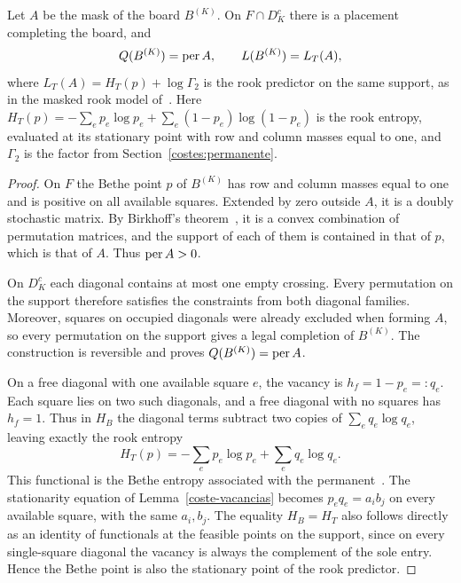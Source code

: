 \begin{lema}\label{terminal-pivotes}
Let $A$ be the mask of the board $B^{(K)}$. On $F\cap D_K^c$ there is a placement completing the
board, and
\[
 Q(B^{(K)})=\operatorname{per} A,\qquad L(B^{(K)})=L_T(A),
\]
where $L_T(A)=H_T(p)+\log\Gamma_2$ is the rook predictor on the same support, as in the
masked rook model of~\cite[Sections~8.1 and~8.5]{pred}. Here
$H_T(p)=-\sum_e p_e\log p_e+\sum_e(1-p_e)\log(1-p_e)$ is the rook entropy, evaluated at its
stationary point with row and column masses equal to one, and $\Gamma_2$ is the factor from
Section~\ref{costes:permanente}.
\end{lema}
\begin{proof}
On $F$ the Bethe point $p$ of $B^{(K)}$ has row and column masses equal to one and is positive on all
available squares. Extended by zero outside $A$, it is a doubly stochastic matrix. By Birkhoff's
theorem~\cite{birkhoff}, it is a convex combination of permutation matrices, and the support of each
of them is contained in that of $p$, which is that of $A$. Thus $\operatorname{per} A>0$.

On $D_K^c$ each diagonal contains at most one empty crossing. Every permutation on the support
therefore satisfies the constraints from both diagonal families. Moreover, squares on occupied
diagonals were already excluded when forming $A$, so every permutation on the support gives a
legal completion of $B^{(K)}$. The construction is reversible and proves $Q(B^{(K)})=\operatorname{per} A$.

On a free diagonal with one available square $e$, the vacancy is $h_f=1-p_e=:q_e$. Each square
lies on two such diagonals, and a free diagonal with no squares has $h_f=1$. Thus in $H_B$ the
diagonal terms subtract two copies of $\sum_e q_e\log q_e$, leaving exactly the rook entropy
\[
 H_T(p)=-\sum_e p_e\log p_e+\sum_e q_e\log q_e .
\]
This functional is the Bethe entropy associated with the permanent~\cite{vontobel}.
The stationarity equation of Lemma~\ref{coste-vacancias} becomes $p_eq_e=a_ib_j$ on every
available square, with the same $a_i,b_j$. The equality $H_B=H_T$ also follows directly as an
identity of functionals at the feasible points on the support, since on every single-square
diagonal the vacancy is always the complement of the sole entry. Hence the Bethe point is also
the stationary point of the rook predictor.


\end{proof}
